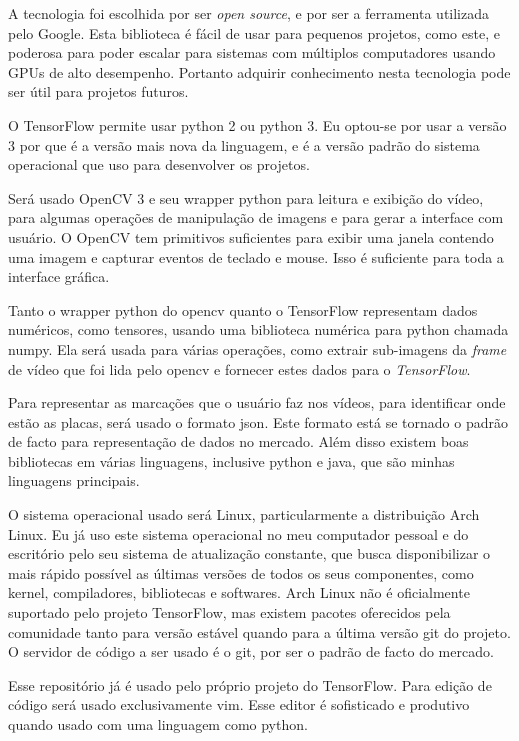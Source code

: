 A tecnologia foi escolhida por ser \emph{open source}, e por ser a ferramenta
utilizada pelo Google. Esta biblioteca é fácil de usar para pequenos projetos,
como este, e poderosa para poder escalar para sistemas com múltiplos
computadores usando GPUs de alto desempenho. Portanto adquirir conhecimento
nesta tecnologia pode ser útil para projetos futuros.

O TensorFlow permite usar python 2 ou python 3. Eu optou-se por usar a versão 3
por que é a versão mais nova da linguagem, e é a versão padrão do sistema
operacional que uso para desenvolver os projetos.

Será usado OpenCV 3 e seu wrapper python para leitura e exibição do vídeo, para
algumas operações de manipulação de imagens e para gerar a interface com
usuário. O OpenCV tem primitivos suficientes para exibir uma janela contendo
uma imagem e capturar eventos de teclado e mouse. Isso é suficiente para toda a
interface gráfica.

Tanto o wrapper python do opencv quanto o TensorFlow representam dados
numéricos, como tensores, usando uma biblioteca numérica para python chamada
numpy. Ela será usada para várias operações, como extrair sub-imagens da
\emph{frame} de vídeo que foi lida pelo opencv e fornecer estes dados para
o \emph{TensorFlow}.

Para representar as marcações que o usuário faz nos vídeos, para identificar
onde estão as placas, será usado o formato json. Este formato está se tornado o
padrão de facto para representação de dados no mercado. Além disso existem boas
bibliotecas em várias linguagens, inclusive python e java, que são minhas
linguagens principais.

O sistema operacional usado será Linux, particularmente a distribuição Arch
Linux. Eu já uso este sistema operacional no meu computador pessoal e do
escritório pelo seu sistema de atualização constante, que busca disponibilizar
o mais rápido possível as últimas versões de todos os seus componentes, como
kernel, compiladores, bibliotecas e softwares.
Arch Linux não é oficialmente suportado pelo projeto TensorFlow, mas existem
pacotes oferecidos pela comunidade tanto para versão estável quando para a
última versão git do projeto.
O servidor de código a ser usado é o git, por ser o padrão de facto do mercado.

Esse repositório já é usado pelo próprio projeto do TensorFlow.
Para edição de código será usado exclusivamente vim. Esse editor é sofisticado
e produtivo quando usado com uma linguagem como python.


